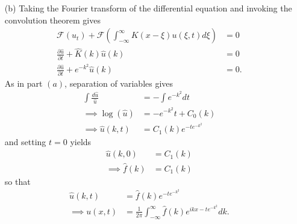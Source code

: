\documentclass{article}
\begin{document}
\begin{itemize}
\begin{itemize}
        \item[(b)] Taking the Fourier transform of the differential equation and invoking the convolution theorem gives
        \begin{align*}
            \mathcal{F}(u_t) + \mathcal{F}\left(\int_{-\infty}^{\infty}K(x - \xi)u(\xi,t)d\xi\right) &= 0\\
            \frac{\partial \hat{u}}{\partial t} + \hat{K}(k)\hat{u}(k) &= 0\\
            \frac{\partial \hat{u}}{\partial t} + e^{-k^2}\hat{u}(k) &= 0.
        \end{align*}
        As in part $(a)$, separation of variables gives
        \begin{align*}
            \int\frac{d\hat{u}}{\hat{u}} &= -\int e^{-k^2}dt\\
            \implies \log(\hat{u}) &= -e^{-k^2}t + C_0(k)\\
            \implies \hat{u}(k,t) &= C_1(k)e^{-te^{-k^2}}
        \end{align*}
        and setting $t = 0$ yields
        \begin{align*}
            \hat{u}(k,0) &= C_1(k)\\
            \implies \hat{f}(k) &= C_1(k)
        \end{align*}
        so that 
        \begin{align*}
            \hat{u}(k,t) &= \hat{f}(k)e^{-te^{-k^2}}\\
            \implies u(x,t) &= \frac{1}{2\pi}\int_{-\infty}^{\infty} \hat{f}(k)e^{ikx - te^{-k^2}}dk.
        \end{align*}


\end{itemize}
\end{itemize}
\end{document}
